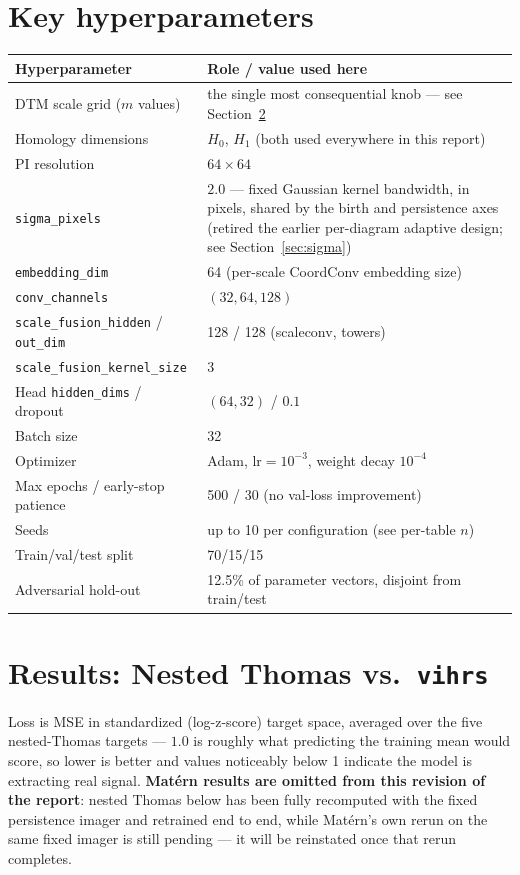 \documentclass[11pt]{article}
\begin{document}
\section{Key hyperparameters}

\begin{center}
\begin{tabular}{@{}ll@{}}
\toprule
\textbf{Hyperparameter} & \textbf{Role / value used here} \\
\midrule
DTM scale grid ($m$ values) & the single most consequential knob — see Section~\ref{sec:results} \\
Homology dimensions & $H_0$, $H_1$ (both used everywhere in this report) \\
PI resolution & $64 \times 64$ \\
\texttt{sigma\_pixels} & $2.0$ — fixed Gaussian kernel bandwidth, in pixels,
shared by the birth and persistence axes (retired the earlier per-diagram
adaptive design; see Section~\ref{sec:sigma}) \\
\texttt{embedding\_dim} & 64 (per-scale CoordConv embedding size) \\
\texttt{conv\_channels} & $(32, 64, 128)$ \\
\texttt{scale\_fusion\_hidden} / \texttt{out\_dim} & 128 / 128 (scaleconv, towers) \\
\texttt{scale\_fusion\_kernel\_size} & 3 \\
Head \texttt{hidden\_dims} / dropout & $(64, 32)$ / $0.1$ \\
Batch size & 32 \\
Optimizer & Adam, $\text{lr}=10^{-3}$, weight decay $10^{-4}$ \\
Max epochs / early-stop patience & 500 / 30 (no val-loss improvement) \\
Seeds & up to 10 per configuration (see per-table $n$) \\
Train/val/test split & 70/15/15 \\
Adversarial hold-out & 12.5\% of parameter vectors, disjoint from train/test \\
\bottomrule
\end{tabular}
\end{center}

\section{Results: Nested Thomas vs.\ \texttt{vihrs}}
\label{sec:results}

Loss is MSE in standardized (log-z-score) target space, averaged over the five
nested-Thomas targets — $1.0$ is roughly what predicting the training mean
would score, so lower is better and values noticeably below 1 indicate the
model is extracting real signal. \textbf{Matérn results are omitted from this
revision of the report}: nested Thomas below has been fully recomputed with
the fixed persistence imager and retrained end to end, while Matérn's own
rerun on the same fixed imager is still pending — it will be reinstated once
that rerun completes.
\end{document}
